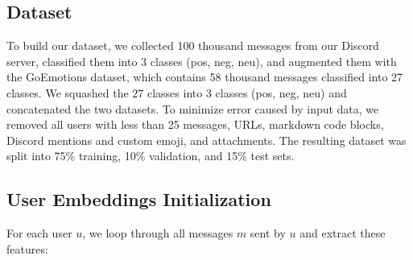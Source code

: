 \documentclass{article}
\begin{document}
\subsection{Dataset}
To build our dataset, we collected 100 thousand messages from our Discord server, classified them into 3 classes (pos, neg, neu), and augmented them with the GoEmotions\cite{demszky2020goemotions} dataset, which contains 58 thousand messages classified into 27 classes. We squashed the 27 classes into 3 classes (pos, neg, neu) and concatenated the two datasets. To minimize error caused by input data, we removed all users with less than 25 messages, URLs, markdown code blocks, Discord mentions and custom emoji, and attachments. The resulting dataset was split into 75\% training, 10\% validation, and 15\% test sets.

\subsection{User Embeddings Initialization}
For each user $u$, we loop through all messages $m$ sent by $u$ and extract these features:
\end{document}

